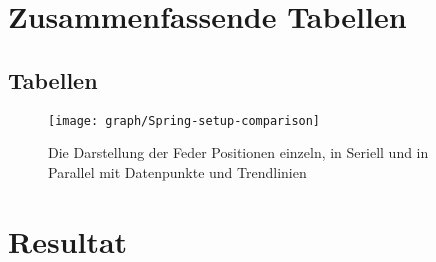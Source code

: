 \documentclass[../main.tex]{subfiles} %
\begin{document}
    \section{Zusammenfassende Tabellen}\label{sec:zusammenfassende-tabellen}
    \subsection{Tabellen}\label{subsec:tabellen}
    \begin{figure}[H]
        \centering
        \texttt{[image: graph/Spring-setup-comparison]}
        \caption{Die Darstellung der Feder Positionen einzeln, in Seriell und in Parallel mit Datenpunkte und Trendlinien}
        \label{fig:graph-spring-setup-comparisons}
    \end{figure}
    \section{Resultat}\label{sec:resultat}
\end{document}
